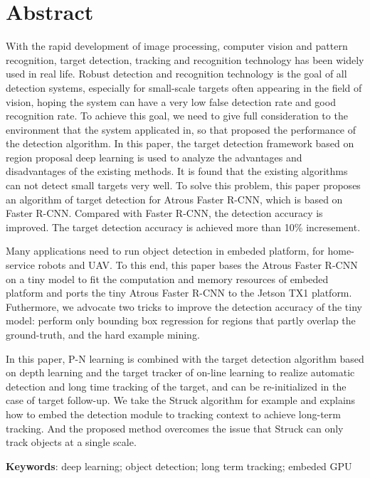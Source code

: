 \chapter*{Abstract}
\hspace*{0.85cm}With the rapid development of image processing, computer vision and pattern recognition, target detection, tracking and recognition technology has been widely used in real life. Robust detection and recognition technology is the goal of all detection systems, especially for small-scale targets often appearing in the field of vision, hoping the system can have a very low false detection rate and good recognition rate. To achieve this goal, we need to give full consideration to the environment that the system applicated in, so that proposed the performance of the detection algorithm. In this paper, the target detection framework based on region proposal deep learning is used to analyze the advantages and disadvantages of the existing methods. It is found that the existing algorithms can not detect small targets very well. To solve this problem, this paper proposes an algorithm of target detection for Atrous Faster R-CNN, which is based on Faster R-CNN. Compared with Faster R-CNN, the detection accuracy is improved. The target detection accuracy is achieved more than 10\% incresement. 

Many applications need to run object detection in embeded platform, for home-service robots and UAV. To this end, this paper bases the Atrous Faster R-CNN on a tiny model to fit the computation and memory resources of embeded platform and ports the tiny Atrous Faster R-CNN to the Jetson TX1 platform. Futhermore, we advocate two tricks to improve the detection accuracy of the tiny model: perform only bounding box regression for regions that partly overlap the ground-truth, and the hard example mining.

In this paper, P-N learning is combined with the target detection algorithm based on depth learning and the target tracker of on-line learning to realize automatic detection and long time tracking of the target, and can be re-initialized in the case of target follow-up. We take the Struck algorithm for example and explains how to embed the detection module to tracking context to achieve long-term tracking. And the proposed method overcomes the issue that Struck can only track objects at a single scale. 

\textbf{Keywords}: deep learning; object detection; long term tracking; embeded GPU